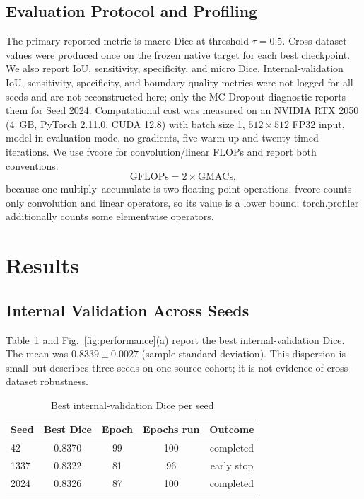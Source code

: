 \documentclass[conference]{IEEEtran}
\begin{document}
\subsection{Evaluation Protocol and Profiling}

The primary reported metric is macro Dice at threshold $\tau=0.5$. Cross-dataset values were produced once on the frozen native target for each best checkpoint. We also report IoU, sensitivity, specificity, and micro Dice. Internal-validation IoU, sensitivity, specificity, and boundary-quality metrics were not logged for all seeds and are not reconstructed here; only the MC Dropout diagnostic reports them for Seed 2024. Computational cost was measured on an NVIDIA RTX 2050 (4~GB, PyTorch 2.11.0, CUDA 12.8) with batch size 1, $512\times512$ FP32 input, model in evaluation mode, no gradients, five warm-up and twenty timed iterations. We use fvcore for convolution/linear FLOPs and report both conventions:
\begin{equation}
\mathrm{GFLOPs}=2\times\mathrm{GMACs},
\label{eq:flops}
\end{equation}
because one multiply--accumulate is two floating-point operations. fvcore counts only convolution and linear operators, so its value is a lower bound; torch.profiler additionally counts some elementwise operators.

\section{Results}
\label{sec:results}

\subsection{Internal Validation Across Seeds}

Table~\ref{tab:seeds} and Fig.~\ref{fig:performance}(a) report the best internal-validation Dice. The mean was $0.8339\pm0.0027$ (sample standard deviation). This dispersion is small but describes three seeds on one source cohort; it is not evidence of cross-dataset robustness.

\begin{table}[!t]
\centering
\caption{Best internal-validation Dice per seed}
\label{tab:seeds}
\begin{tabular}{@{}lcccc@{}}
\toprule
Seed & Best Dice & Epoch & Epochs run & Outcome \\
\midrule
42   & 0.8370 & 99 & 100 & completed \\
1337 & 0.8322 & 81 & 96  & early stop \\
2024 & 0.8326 & 87 & 100 & completed \\
\bottomrule
\end{tabular}
\end{table}
\end{document}
